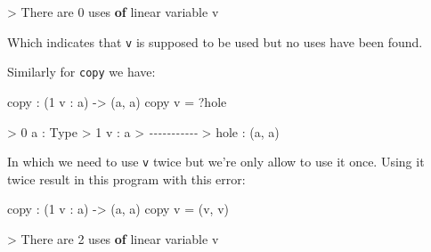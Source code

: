 \documentclass[
]{article}
\newenvironment{Shaded}{}{}
\newcommand{\CommentTok}[1]{\textcolor[rgb]{0.38,0.63,0.69}{\textit{#1}}}
\newcommand{\DataTypeTok}[1]{\textcolor[rgb]{0.56,0.13,0.00}{#1}}
\newcommand{\DecValTok}[1]{\textcolor[rgb]{0.25,0.63,0.44}{#1}}
\newcommand{\KeywordTok}[1]{\textcolor[rgb]{0.00,0.44,0.13}{\textbf{#1}}}
\newcommand{\NormalTok}[1]{#1}
\newcommand{\OperatorTok}[1]{\textcolor[rgb]{0.40,0.40,0.40}{#1}}
\newcommand{\OtherTok}[1]{\textcolor[rgb]{0.00,0.44,0.13}{#1}}
\begin{document}
\begin{Shaded}
\begin{Highlighting}[]
\OperatorTok{\textgreater{}} \DataTypeTok{There}\NormalTok{ are }\DecValTok{0}\NormalTok{ uses }\KeywordTok{of}\NormalTok{ linear variable v}
\end{Highlighting}
\end{Shaded}

Which indicates that \texttt{v} is supposed to be used but no uses have
been found.

Similarly for \texttt{copy} we have:

\begin{Shaded}
\begin{Highlighting}[]
\NormalTok{copy }\OperatorTok{:}\NormalTok{ (}\DecValTok{1}\NormalTok{ v }\OperatorTok{:}\NormalTok{ a) }\OtherTok{{-}\textgreater{}}\NormalTok{ (a, a)}
\NormalTok{copy v }\OtherTok{=} \OperatorTok{?}\NormalTok{hole}
\end{Highlighting}
\end{Shaded}

\begin{Shaded}
\begin{Highlighting}[]
\OperatorTok{\textgreater{}} \DecValTok{0}\NormalTok{ a }\OperatorTok{:} \DataTypeTok{Type}
\OperatorTok{\textgreater{}} \DecValTok{1}\NormalTok{ v }\OperatorTok{:}\NormalTok{ a}
\OperatorTok{\textgreater{}} \CommentTok{{-}{-}{-}{-}{-}{-}{-}{-}{-}{-}{-}}
\OperatorTok{\textgreater{}}\NormalTok{ hole }\OperatorTok{:}\NormalTok{ (a, a)}
\end{Highlighting}
\end{Shaded}

In which we need to use \texttt{v} twice but we're only allow to use it
once. Using it twice result in this program with this error:

\begin{Shaded}
\begin{Highlighting}[]
\NormalTok{copy }\OperatorTok{:}\NormalTok{ (}\DecValTok{1}\NormalTok{ v }\OperatorTok{:}\NormalTok{ a) }\OtherTok{{-}\textgreater{}}\NormalTok{ (a, a)}
\NormalTok{copy v }\OtherTok{=}\NormalTok{ (v, v)}
\end{Highlighting}
\end{Shaded}

\begin{Shaded}
\begin{Highlighting}[]
\OperatorTok{\textgreater{}} \DataTypeTok{There}\NormalTok{ are }\DecValTok{2}\NormalTok{ uses }\KeywordTok{of}\NormalTok{ linear variable v}
\end{Highlighting}
\end{Shaded}
\end{document}

